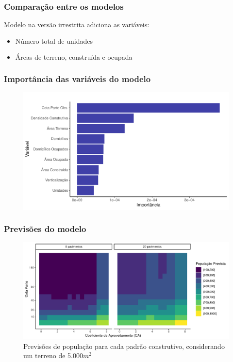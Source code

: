 \documentclass[%
    8pt, 
    aspectratio=169,
]{beamer}
\begin{document}
\begin{frame}
    \frametitle{Comparação entre os modelos}

    \begin{table}
        \centering
    \end{table}
    
    \vspace{1cm}

    Modelo na versão irrestrita adiciona as variáveis: 
    \begin{itemize}
        \item Número total de unidades
        \item Áreas de terreno, construída e ocupada

    \end{itemize}
\end{frame}

\begin{frame}
    \frametitle{Importância das variáveis do modelo}
    \begin{figure}
        \includegraphics[width = .8\textwidth]{imagens/var_importance.pdf}
    \end{figure}
\end{frame}

\begin{frame}
    \frametitle{Previsões do modelo}
    \begin{figure}
        \caption{Previsões de população para cada padrão construtivo, considerando um terreno de 5.000$m^2$}
        \includegraphics[width = .75\textwidth]{imagens/previsoes.pdf}
    \end{figure}
\end{frame}
\end{document}
